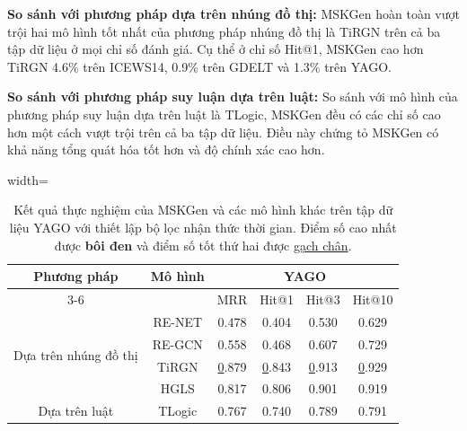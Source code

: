 \textbf{So sánh với phương pháp dựa trên nhúng đồ thị:} MSKGen hoàn toàn vượt trội hai mô hình tốt nhất của phương pháp nhúng đồ thị là TiRGN 
trên cả ba tập dữ liệu ở mọi chỉ số đánh giá. Cụ thể ở chỉ số Hit@1, MSKGen cao hơn TiRGN 4.6\% trên ICEWS14, 0.9\% trên GDELT và 1.3\% trên YAGO.

\textbf{So sánh với phương pháp suy luận dựa trên luật:} So sánh với mô hình của phương pháp suy luận dựa trên luật là TLogic,
MSKGen đều có các chỉ số cao hơn một cách vượt trội trên cả ba tập dữ liệu. Điều này chứng tỏ MSKGen có khả năng tổng quát hóa tốt
hơn và độ chính xác cao hơn.

\begin{table}
\caption{Kết quả thực nghiệm của MSKGen và các mô hình khác trên tập dữ liệu YAGO với thiết lập bộ lọc nhận thức thời gian. 
Điểm số cao nhất được \textbf{bôi đen} và điểm số tốt thứ hai được \underline{gạch chân}.}
\label{tab:table56}
\begin{adjustbox}{width=\textwidth}
\begin{tabular}{|cc|cccc|}
\hline
\multicolumn{1}{|c|}{\multirow{2}{*}{Phương pháp}}     & \multirow{2}{*}{Mô hình} & \multicolumn{4}{c|}{YAGO}                                                                           \\ \cline{3-6} 
\multicolumn{1}{|c|}{}                                 &                          & \multicolumn{1}{c|}{MRR} & \multicolumn{1}{c|}{Hit@1} & \multicolumn{1}{c|}{Hit@3} & Hit@10         \\ \hline
\multicolumn{1}{|c|}{\multirow{4}{*}{Dựa trên nhúng đồ thị}} & RE-NET                   & 0.478                    & 0.404                      & 0.530                      & 0.629          \\ \cline{2-2}
\multicolumn{1}{|c|}{}                                 & RE-GCN                   & 0.558                    & 0.468                      & 0.607                      & 0.729          \\ \cline{2-2}
\multicolumn{1}{|c|}{}                                 & TiRGN                    & {\ul 0.879}              & {\ul 0.843}                & {\ul 0.913}                & {\ul 0.929}    \\ \cline{2-2}
\multicolumn{1}{|c|}{}                                 & HGLS                     & 0.817                    & 0.806                      & 0.901                      & 0.919          \\ \hline
\multicolumn{1}{|c|}{Dựa trên luật}                    & TLogic                   & 0.767                    & 0.740                      & 0.789                      & 0.791          \\ \hline

\end{tabular}
\end{adjustbox}
\end{table}
